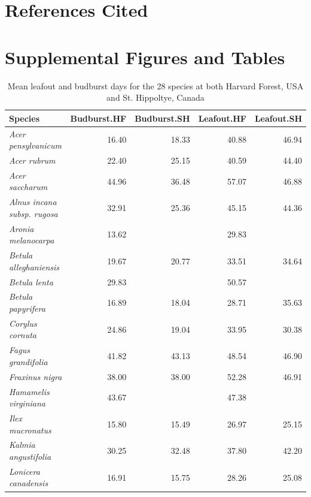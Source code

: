 \documentclass{article}
\begin{document}
\section*{References Cited}




\section*{Supplemental Figures and Tables}

\begin{table}[ht]
\centering
\caption{Mean leafout and budburst days for the 28 species at both Harvard Forest, USA and St. Hippoltye, Canada} 
\begin{tabular}{lrrrr}
  \hline
Species & Budburst.HF & Budburst.SH & Leafout.HF & Leafout.SH \\ 
  \hline
\textit{Acer pensylvanicum} & 16.40 & 18.33 & 40.88 & 46.94 \\ 
  \textit{Acer rubrum} & 22.40 & 25.15 & 40.59 & 44.40 \\ 
  \textit{Acer saccharum} & 44.96 & 36.48 & 57.07 & 46.88 \\ 
  \textit{Alnus incana subsp. rugosa} & 32.91 & 25.36 & 45.15 & 44.36 \\ 
  \textit{Aronia melanocarpa} & 13.62 &  & 29.83 &  \\ 
  \textit{Betula alleghaniensis} & 19.67 & 20.77 & 33.51 & 34.64 \\ 
  \textit{Betula lenta} & 29.83 &  & 50.57 &  \\ 
  \textit{Betula papyrifera} & 16.89 & 18.04 & 28.71 & 35.63 \\ 
  \textit{Corylus cornuta} & 24.86 & 19.04 & 33.95 & 30.38 \\ 
  \textit{Fagus grandifolia} & 41.82 & 43.13 & 48.54 & 46.90 \\ 
  \textit{Fraxinus nigra} & 38.00 & 38.00 & 52.28 & 46.91 \\ 
  \textit{Hamamelis virginiana} & 43.67 &  & 47.38 &  \\ 
  \textit{Ilex mucronatus} & 15.80 & 15.49 & 26.97 & 25.15 \\ 
  \textit{Kalmia angustifolia} & 30.25 & 32.48 & 37.80 & 42.20 \\ 
  \textit{Lonicera canadensis} & 16.91 & 15.75 & 28.26 & 25.08 \\ 

\end{tabular}
\end{table}
\end{document}
